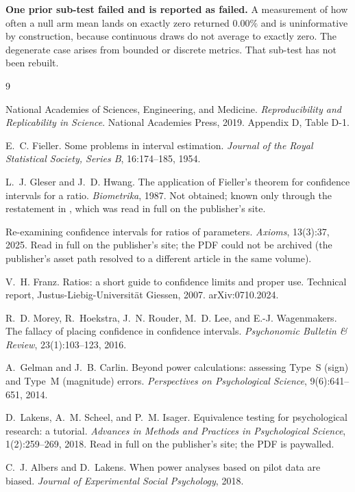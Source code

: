 \documentclass[11pt,letterpaper]{article}
\begin{document}
\textbf{One prior sub-test failed and is reported as failed.} A measurement of how
often a null arm mean lands on exactly zero returned $0.00\%$ and is
uninformative by construction, because continuous draws do not average to exactly
zero. The degenerate case arises from bounded or discrete metrics. That sub-test
has not been rebuilt.

\begin{thebibliography}{9}

National Academies of Sciences, Engineering, and Medicine.
\emph{Reproducibility and Replicability in Science}.
National Academies Press, 2019. Appendix D, Table D-1.

E.~C. Fieller.
Some problems in interval estimation.
\emph{Journal of the Royal Statistical Society, Series B}, 16:174--185, 1954.

L.~J. Gleser and J.~D. Hwang.
The application of Fieller's theorem for confidence
intervals for a ratio.
\emph{Biometrika}, 1987. Not obtained; known only through the restatement in
\cite{axioms2025}, which was read in full on the publisher's site.

Re-examining confidence intervals for ratios of parameters.
\emph{Axioms}, 13(3):37, 2025. Read in full on the publisher's site; the PDF
could not be archived (the publisher's asset path resolved to a different
article in the same volume).

V.~H. Franz.
Ratios: a short guide to confidence limits and proper use.
Technical report, Justus-Liebig-Universit\"at Giessen, 2007. arXiv:0710.2024.

R.~D. Morey, R.~Hoekstra, J.~N. Rouder, M.~D. Lee, and E.-J. Wagenmakers.
The fallacy of placing confidence in confidence intervals.
\emph{Psychonomic Bulletin \& Review}, 23(1):103--123, 2016.

A.~Gelman and J.~B. Carlin.
Beyond power calculations: assessing Type~S (sign) and Type~M (magnitude)
errors.
\emph{Perspectives on Psychological Science}, 9(6):641--651, 2014.

D.~Lakens, A.~M. Scheel, and P.~M. Isager.
Equivalence testing for psychological research: a tutorial.
\emph{Advances in Methods and Practices in Psychological Science}, 1(2):259--269,
2018. Read in full on the publisher's site; the PDF is paywalled.

C.~J. Albers and D.~Lakens.
When power analyses based on pilot data are biased.
\emph{Journal of Experimental Social Psychology}, 2018.


\end{thebibliography}
\end{document}
